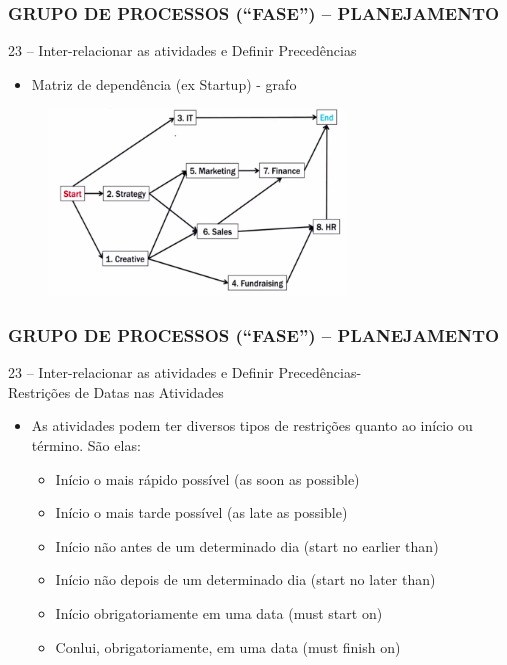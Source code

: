 \begin{frame}
 \frametitle{GRUPO DE PROCESSOS (“FASE”) – PLANEJAMENTO}
 23 – Inter-relacionar as atividades e Definir Precedências
 \begin{itemize}
  \item Matriz de dependência (ex Startup) - grafo
 \end{itemize}
  \begin{figure}
   \centering
   \includegraphics[width = 0.7\textwidth]{figs/fig23.png}
  \end{figure}
\end{frame}
\begin{frame}
 \frametitle{GRUPO DE PROCESSOS (“FASE”) – PLANEJAMENTO}
23 – Inter-relacionar as atividades e Definir Precedências-\\
Restrições de Datas nas Atividades
  \begin{itemize}
   \item As atividades podem ter diversos tipos de restrições quanto ao início ou término. São elas:
   \begin{itemize}
    \item Início o mais rápido possível (as soon as possible)
    \item Início o mais tarde possível (as late as possible)
    \item Início não antes de um determinado dia (start no earlier than)
    \item Início não depois de um determinado dia (start no later than)
    \item Início obrigatoriamente em uma data (must start on)
    \item Conlui, obrigatoriamente, em uma data (must finish on)
   \end{itemize}
  \end{itemize}
\end{frame}


